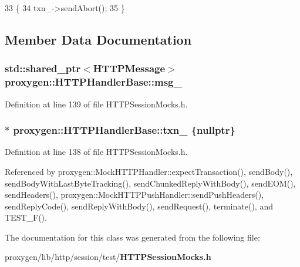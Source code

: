 \begin{DoxyCode}
33                    \{
34     txn_->sendAbort();
35   \}
\end{DoxyCode}


\subsection{Member Data Documentation}
\subsubsection[{msg\+\_\+}]{\setlength{\rightskip}{0pt plus 5cm}std\+::shared\+\_\+ptr$<${\bf H\+T\+T\+P\+Message}$>$ proxygen\+::\+H\+T\+T\+P\+Handler\+Base\+::msg\+\_\+}\label{classproxygen_1_1HTTPHandlerBase_ad56911700c76ae21973e6cd8ba6d972c}


Definition at line 139 of file H\+T\+T\+P\+Session\+Mocks.\+h.

\subsubsection[{txn\+\_\+}]{$\ast$ proxygen\+::\+H\+T\+T\+P\+Handler\+Base\+::txn\+\_\+ \{{\bf nullptr}\}}\label{classproxygen_1_1HTTPHandlerBase_a0d1cc0ce73811f41a220ed05802a0ff0}


Definition at line 138 of file H\+T\+T\+P\+Session\+Mocks.\+h.



Referenced by proxygen\+::\+Mock\+H\+T\+T\+P\+Handler\+::expect\+Transaction(), send\+Body(), send\+Body\+With\+Last\+Byte\+Tracking(), send\+Chunked\+Reply\+With\+Body(), send\+E\+O\+M(), send\+Headers(), proxygen\+::\+Mock\+H\+T\+T\+P\+Push\+Handler\+::send\+Push\+Headers(), send\+Reply\+Code(), send\+Reply\+With\+Body(), send\+Request(), terminate(), and T\+E\+S\+T\+\_\+\+F().



The documentation for this class was generated from the following file\+:\begin{DoxyCompactItemize}
\item 
proxygen/lib/http/session/test/{\bf H\+T\+T\+P\+Session\+Mocks.\+h}\end{DoxyCompactItemize}
